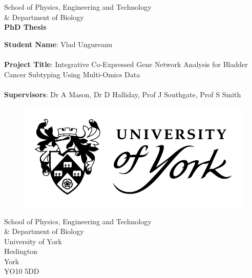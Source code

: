 \begin{titlepage} 
  \begin{center} 
    
    	\large School of Physics, Engineering and Technology \\ \& Department of Biology \\
        \vspace{1.2cm}
		\Huge \textbf{PhD Thesis} \\
        \vspace{1.2cm}
            
       \begin{flushleft}
        \large \textbf{Student Name}: Vlad Ungureanu \\~\\
        \large \textbf{Project Title}: Integrative Co-Expressed Gene Network Analysis for Bladder Cancer Subtyping Using Multi-Omics Data \\~\\
        \large \textbf{Supervisors}: Dr A Mason, Dr D Halliday, Prof J Southgate, Prof S Smith
 
       \end{flushleft} 
            
           \begin{figure}[t]
          	\includegraphics[scale=0.5]{Images/UOY_logo.png}
          \end{figure}
    \vspace{1.2cm}
    \small School of Physics, Engineering and Technology \\ \& Department of Biology \\
    \small University of York \\
    \small Heslington \\
    \small York \\
    \small YO10 5DD\\
                  
 \end{center} 

\end{titlepage}